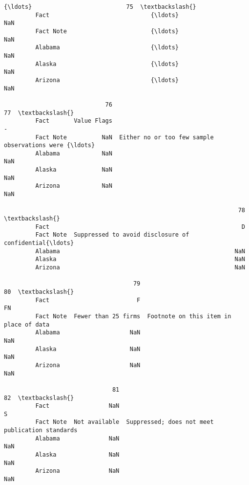 \documentclass[11pt]{article}
\begin{document}
\begin{Verbatim}[commandchars=\\\{\}]
                                          {\ldots}                           75  \textbackslash{}
         Fact                             {\ldots}                          NaN   
         Fact Note                        {\ldots}                          NaN   
         Alabama                          {\ldots}                          NaN   
         Alaska                           {\ldots}                          NaN   
         Arizona                          {\ldots}                          NaN   
         
                             76                                                 77  \textbackslash{}
         Fact       Value Flags                                                  -   
         Fact Note          NaN  Either no or too few sample observations were {\ldots}   
         Alabama            NaN                                                NaN   
         Alaska             NaN                                                NaN   
         Arizona            NaN                                                NaN   
         
                                                                   78  \textbackslash{}
         Fact                                                       D   
         Fact Note  Suppressed to avoid disclosure of confidential{\ldots}   
         Alabama                                                  NaN   
         Alaska                                                   NaN   
         Arizona                                                  NaN   
         
                                     79                                      80  \textbackslash{}
         Fact                         F                                      FN   
         Fact Note  Fewer than 25 firms  Footnote on this item in place of data   
         Alabama                    NaN                                     NaN   
         Alaska                     NaN                                     NaN   
         Arizona                    NaN                                     NaN   
         
                               81                                               82  \textbackslash{}
         Fact                 NaN                                                S   
         Fact Note  Not available  Suppressed; does not meet publication standards   
         Alabama              NaN                                              NaN   
         Alaska               NaN                                              NaN   
         Arizona              NaN                                              NaN   
         

\end{Verbatim}
\end{document}
